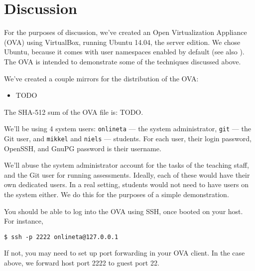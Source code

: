 
\chapter{Discussion}

For the purposes of discussion, we've created an Open Virtualization Appliance
(OVA) using VirtualBox, running Ubuntu 14.04, the server edition. We chose
Ubuntu, because it comes with user namespaces enabled by default (see also
). The OVA is intended to
demonstrate some of the techniques discussed above.

We've created a couple mirrors for the distribution of the OVA:

\begin{itemize}

\item TODO

\end{itemize}

The SHA-512 sum of the OVA file is: TODO.

We'll be using 4 system users: \texttt{onlineta} --- the system administrator,
\texttt{git} --- the Git user, and \texttt{mikkel} and \texttt{niels} ---
students. For each user, their login password, OpenSSH, and GnuPG password is
their username.

We'll abuse the system administrator account for the tasks of the teaching
staff, and the Git user for running assessments. Ideally, each of these would
have their own dedicated users. In a real setting, students would not need to
have users on the system either. We do this for the purposes of a simple
demonstration.

You should be able to log into the OVA using SSH, once booted on your host.
For instance,

\begin{lstlisting}
$ ssh -p 2222 onlineta@127.0.0.1
\end{lstlisting}

If not, you may need to set up port forwarding in your OVA client. In the case
above, we forward host port 2222 to guest port 22.


